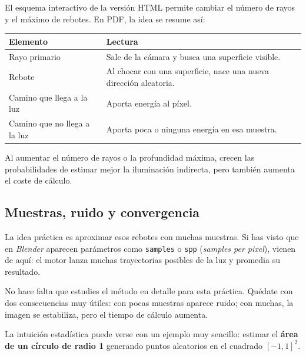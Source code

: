 \documentclass[
  spanish,
  11pt,
  a4paper,
  DIV=11,
  numbers=noendperiod]{scrartcl}
\begin{document}
El esquema interactivo de la versión HTML permite cambiar el número de rayos y el máximo de rebotes. En PDF, la idea se resume así:

\begin{longtable}[]{@{}
  >{\raggedright\arraybackslash}p{}
  >{\raggedright\arraybackslash}p{}@{}}
\toprule\noalign{}
\begin{minipage}[b]{\linewidth}\raggedright
Elemento
\end{minipage} & \begin{minipage}[b]{\linewidth}\raggedright
Lectura
\end{minipage} \\
\midrule\noalign{}
\endhead
\bottomrule\noalign{}
\endlastfoot
Rayo primario & Sale de la cámara y busca una superficie visible. \\
Rebote & Al chocar con una superficie, nace una nueva dirección aleatoria. \\
Camino que llega a la luz & Aporta energía al píxel. \\
Camino que no llega a la luz & Aporta poca o ninguna energía en esa muestra. \\
\end{longtable}

Al aumentar el número de rayos o la profundidad máxima, crecen las probabilidades de estimar mejor la iluminación indirecta, pero también aumenta el coste de cálculo.

\subsection{Muestras, ruido y convergencia}

\label{muestras-ruido-y-convergencia}

La idea práctica es aproximar esos rebotes con muchas muestras. Si has visto que en \emph{Blender} aparecen parámetros como \texttt{samples} o \texttt{spp} (\emph{samples per pixel}), vienen de aquí: el motor lanza muchas trayectorias posibles de la luz y promedia su resultado.

No hace falta que estudies el método en detalle para esta práctica. Quédate con dos consecuencias muy útiles: con pocas muestras aparece ruido; con muchas, la imagen se estabiliza, pero el tiempo de cálculo aumenta.

La intuición estadística puede verse con un ejemplo muy sencillo: estimar el \textbf{área de un círculo de radio 1} generando puntos aleatorios en el cuadrado \([-1,1]^2\).
\end{document}
